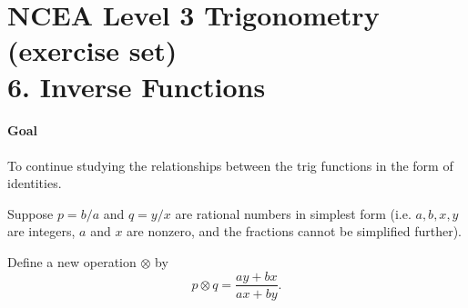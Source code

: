 \documentclass[answers]{exam}
\DeclareMathOperator{\arcversin}{arcversin}
\begin{document}
\section*{NCEA Level 3 Trigonometry (exercise set)\\6. Inverse Functions}
\paragraph{Goal} To continue studying the relationships between the trig functions in the form of identities.

\begin{questions}
  \question
  \question
  \question Suppose $ p = b/a $ and $ q = y/x $ are rational numbers in simplest form (i.e. $ a, b, x, y $ are integers, $ a $ and $ x $ are nonzero,
            and the fractions cannot be simplified further).

            Define a new operation $ \otimes $ by
            \begin{displaymath}
              p \otimes q = \frac{ay + bx}{ax + by}.
            \end{displaymath}
    \begin{parts}

\end{parts}
\end{questions}
\end{document}
